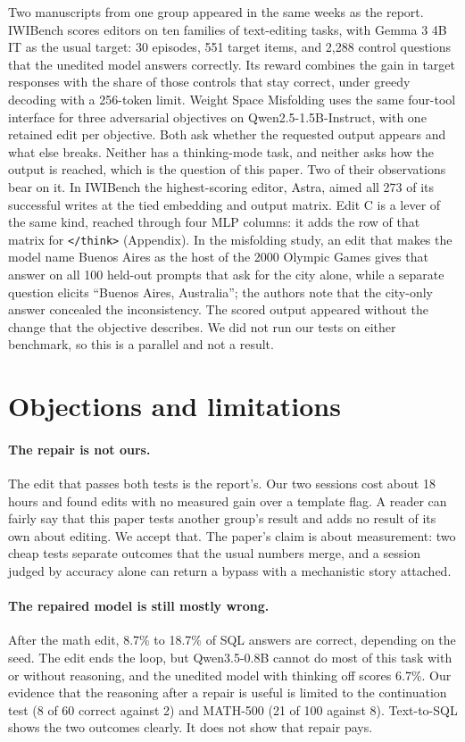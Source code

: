 \documentclass[11pt]{article}
\newcommand{\think}{\texttt{</think>}}
\newcommand{\Qwen}{Qwen3.5-0.8B}
\begin{document}
Two manuscripts from one group appeared in the same weeks as the report. IWIBench \cite{iwibench} scores editors on ten families of text-editing tasks, with Gemma 3 4B IT as the usual target: 30 episodes, 551 target items, and 2,288 control questions that the unedited model answers correctly. Its reward combines the gain in target responses with the share of those controls that stay correct, under greedy decoding with a 256-token limit. Weight Space Misfolding \cite{misfolding} uses the same four-tool interface for three adversarial objectives on Qwen2.5-1.5B-Instruct, with one retained edit per objective. Both ask whether the requested output appears and what else breaks. Neither has a thinking-mode task, and neither asks how the output is reached, which is the question of this paper. Two of their observations bear on it. In IWIBench the highest-scoring editor, Astra, aimed all 273 of its successful writes at the tied embedding and output matrix. Edit C is a lever of the same kind, reached through four MLP columns: it adds the row of that matrix for \think{} (Appendix). In the misfolding study, an edit that makes the model name Buenos Aires as the host of the 2000 Olympic Games gives that answer on all 100 held-out prompts that ask for the city alone, while a separate question elicits ``Buenos Aires, Australia''; the authors note that the city-only answer concealed the inconsistency. The scored output appeared without the change that the objective describes. We did not run our tests on either benchmark, so this is a parallel and not a result.

\section{Objections and limitations}

\paragraph{The repair is not ours.} The edit that passes both tests is the report's. Our two sessions cost about 18 hours and found edits with no measured gain over a template flag. A reader can fairly say that this paper tests another group's result and adds no result of its own about editing. We accept that. The paper's claim is about measurement: two cheap tests separate outcomes that the usual numbers merge, and a session judged by accuracy alone can return a bypass with a mechanistic story attached.

\paragraph{The repaired model is still mostly wrong.} After the math edit, 8.7\% to 18.7\% of SQL answers are correct, depending on the seed. The edit ends the loop, but \Qwen{} cannot do most of this task with or without reasoning, and the unedited model with thinking off scores 6.7\%. Our evidence that the reasoning after a repair is useful is limited to the continuation test (8 of 60 correct against 2) and MATH-500 (21 of 100 against 8). Text-to-SQL shows the two outcomes clearly. It does not show that repair pays.
\end{document}
